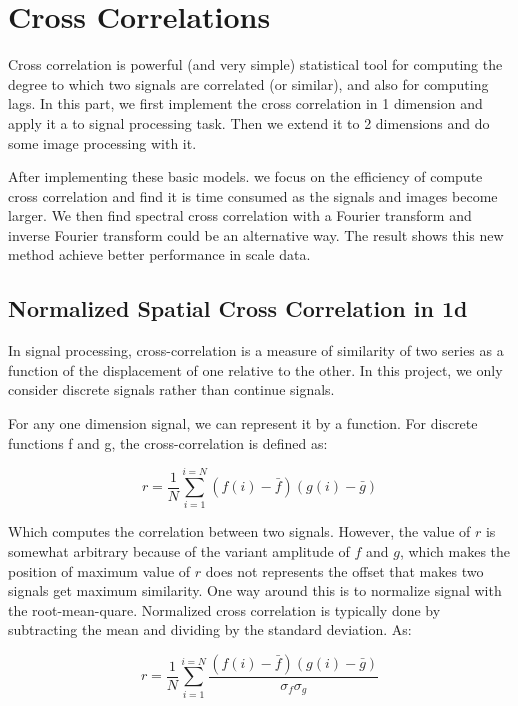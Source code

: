 \chapter{Cross Correlations}\label{part: cross correlations}

Cross correlation is powerful (and very simple) statistical tool for computing the degree to which two signals are correlated (or similar), and also for computing lags. In this part, we first implement the cross correlation in 1 dimension and apply it a to signal processing task. Then we extend it to 2 dimensions and do some image processing with it. 

After implementing these basic models. we focus on the efficiency of compute cross correlation and find it is time consumed as the signals and images become larger. We then find spectral cross correlation with a Fourier transform and inverse Fourier transform could be an alternative way. The result shows this new method achieve better performance in scale data.

\section{Normalized Spatial Cross Correlation in 1d}

In signal processing, cross-correlation is a measure of similarity of two series as a function of the displacement of one relative to the other. In this project, we only consider discrete signals rather than continue signals.

For any one dimension signal, we can represent it by a function. For discrete functions f and g, the cross-correlation is defined as:

\begin{equation*}
r=\frac{1}{N}
\sum_{i=1}^{i=N}(f(i)-\bar{f})(g(i)-\bar{g})
\end{equation*}

Which computes the correlation between two signals. However, the value of $r$ is somewhat arbitrary because of the variant amplitude of $f$ and $g$, which makes the position of maximum value of $r$ does not represents the offset that makes two signals get maximum similarity. One way around this is to normalize signal with the root-mean-quare. Normalized cross correlation is typically done by subtracting the mean and dividing by the standard deviation. As:

\begin{equation*}
r=\frac{1}{N}
\sum_{i=1}^{i=N}
\frac{(f(i)-\bar{f})(g(i)-\bar{g})}{\sigma _{f}\sigma _{g}}
\end{equation*}


